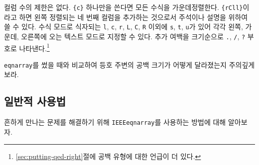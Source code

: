 컬럼 수의 제한은 없다. \verb|{c}| 하나만을 쓴다면 모든 수식을 가운데정렬한다.
\verb|{rCll}|이라고 하면 왼쪽 정렬되는 네 번째 컬럼을 추가하는 것으로서 주석이나 설명을 위하여 쓸 수 있다.
수식 모드로 식자되는 \texttt{l}, \texttt{c}, \texttt{r}, \texttt{L}, \texttt{C}, \texttt{R} 이외에
\texttt{s}, \texttt{t}, \texttt{u}가 있어 각각 왼쪽, 가운데, 오른쪽에 오는 텍스트 모드로 지정할 수 있다.
추가 여백을 크기순으로 \texttt{.}, \texttt{/}, \texttt{?} 부호로 나타낸다.\footnote{%
  \ref{sec:putting-qed-right}절에 공백 유형에 대한 언급이 더 있다.
}

\texttt{eqnarray}를 썼을 때와 비교하여 등호 주변의 공백 크기가 어떻게 달라졌는지 주의깊게 보라.

\subsection{일반적 사용법}
\label{sec:common-usage}

흔하게 만나는 문제를 해결하기 위해 \texttt{IEEEeqnarray}를 사용하는 방법에 대해 알아보자.


